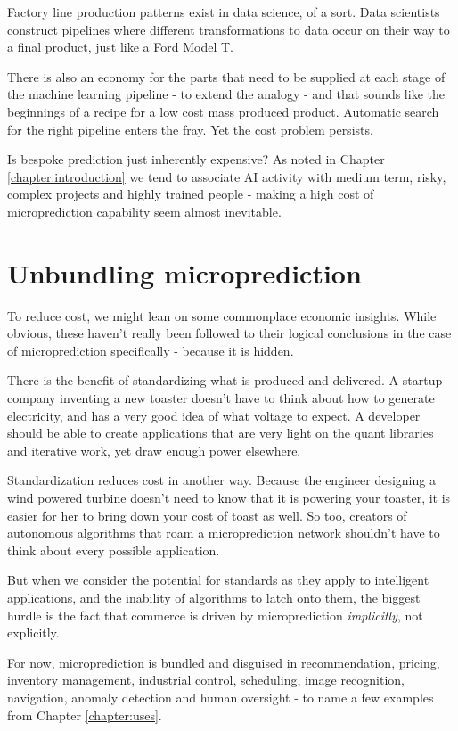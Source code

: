Factory line production patterns exist in data science, of a sort.  Data scientists construct pipelines where different transformations to data occur on their way to a final product, just like a Ford Model T. 

There is also an economy for the parts that need to be supplied at each stage of the machine learning pipeline - to extend the analogy - and that sounds like the beginnings of a recipe for a low cost mass produced product. Automatic search for the right pipeline enters the fray. Yet the cost problem persists. 

Is bespoke prediction just inherently expensive?  As noted in Chapter \ref{chapter:introduction} we tend to associate AI activity with medium term, risky, complex projects and highly trained people - making a high cost of microprediction capability seem almost inevitable.


\section{Unbundling microprediction}
 
To reduce cost, we might lean on some commonplace economic insights. While obvious, these haven't really been followed to their logical conclusions in the case of microprediction specifically - because it is hidden. 

There is the benefit of standardizing what is produced and delivered. A startup company inventing a new toaster doesn't have to think about how to generate electricity, and has a very good idea of what voltage to expect. A developer should be able to create applications that are very light on the quant libraries and iterative work, yet draw enough power elsewhere. 


Standardization reduces cost in another way. Because the engineer designing a wind powered turbine doesn't need to know that it is powering your toaster, it is easier for her to bring down your cost of toast as well. So too, creators of autonomous algorithms that roam a microprediction network shouldn't have to think about every possible application. 

But when we consider the potential for standards as they apply to intelligent applications, and the inability of algorithms to latch onto them, the biggest hurdle is the fact that commerce is driven by microprediction {\em implicitly}, not explicitly. 


For now, microprediction is bundled and disguised in recommendation, pricing, inventory management, industrial control, scheduling, image recognition, navigation, anomaly detection and human oversight - to name a few examples from Chapter \ref{chapter:uses}.

